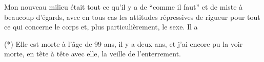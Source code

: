 Mon nouveau milieu était tout ce qu'il y a de ``comme il faut'' et de \newline
miste à beaucoup d'égards, avec en tous cas les attitudes répressives de rigueur
pour tout ce qui concerne le corps et, plus particulièrement, le sexe. Il a 

(*) Elle est morte à l'âge de 99 ans, il y a deux ans, et j'ai encore pu la voir
morte, en tête à tête avec elle, la veille de l'enterrement.
